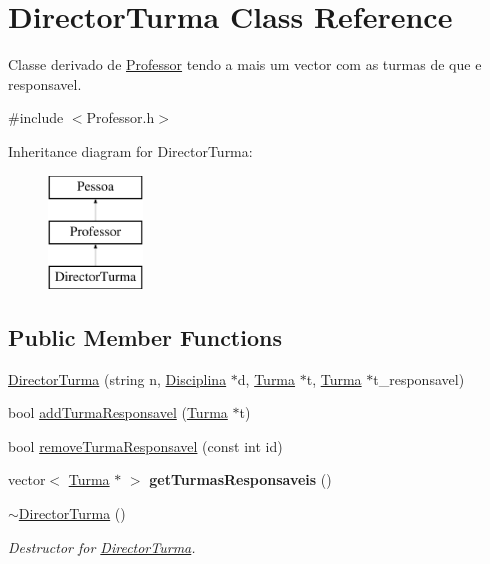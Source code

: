 \hypertarget{class_director_turma}{\section{Director\-Turma Class Reference}
\label{class_director_turma}
}


Classe derivado de \hyperlink{class_professor}{Professor} tendo a mais um vector com as turmas de que e responsavel.  




{\ttfamily \#include $<$Professor.\-h$>$}

Inheritance diagram for Director\-Turma\-:\begin{figure}[H]
\begin{center}
\leavevmode
\includegraphics[height=3.000000cm]{class_director_turma}
\end{center}
\end{figure}
\subsection*{Public Member Functions}
\begin{DoxyCompactItemize}
\item 
\hyperlink{class_director_turma_a68cae9fe812395183f4da5e8b2f5cfe6}{Director\-Turma} (string n, \hyperlink{class_disciplina}{Disciplina} $\ast$d, \hyperlink{class_turma}{Turma} $\ast$t, \hyperlink{class_turma}{Turma} $\ast$t\-\_\-responsavel)
\item 
bool \hyperlink{class_director_turma_a99567238fee363836711fb01e7b49617}{add\-Turma\-Responsavel} (\hyperlink{class_turma}{Turma} $\ast$t)
\item 
bool \hyperlink{class_director_turma_a08f76bfffd82b428bd601773fe44a26e}{remove\-Turma\-Responsavel} (const int id)
\item 
\hypertarget{class_director_turma_ad481d568f5e9f30ddcfa6a6c65daaf1b}{vector$<$ \hyperlink{class_turma}{Turma} $\ast$ $>$ {\bfseries get\-Turmas\-Responsaveis} ()}\label{class_director_turma_ad481d568f5e9f30ddcfa6a6c65daaf1b}

\item 
\hypertarget{class_director_turma_aff25a8b46c65247f194598fcef54e4b1}{\hyperlink{class_director_turma_aff25a8b46c65247f194598fcef54e4b1}{$\sim$\-Director\-Turma} ()}\label{class_director_turma_aff25a8b46c65247f194598fcef54e4b1}

\begin{DoxyCompactList}\small\item\em Destructor for \hyperlink{class_director_turma}{Director\-Turma}. \end{DoxyCompactList}\end{DoxyCompactItemize}


